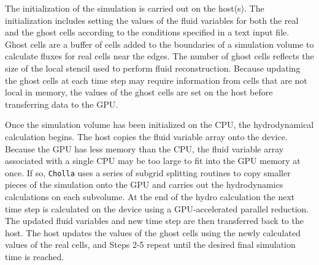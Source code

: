 \documentclass[11pt,letterpaper,english]{article}
\begin{document}
The initialization of the simulation is carried out on the host(s). The initialization includes setting the values of the fluid variables for both the real and the ghost cells according to the conditions specified in a text input file. Ghost cells are a buffer of cells added to the boundaries of a simulation volume to calculate fluxes for real cells near the edges. The number of ghost cells reflects the size of the local stencil used to perform fluid reconstruction. Because updating the ghost cells at each time step may require information from cells that are not local in memory, the values of the ghost cells are set on the host before transferring data to the GPU.

Once the simulation volume has been initialized on the CPU, the hydrodynamical calculation begins. The host copies the fluid variable array onto the device. Because the GPU has less memory than the CPU, the fluid variable array associated with a single CPU may be too large to fit into the GPU memory at once. If so, {\tt Cholla} uses a series of 
subgrid splitting routines to copy smaller pieces of the simulation onto the GPU and carries out the hydrodynamics calculations on each subvolume. At the end of the hydro calculation the next time step is calculated on the device using a GPU-accelerated parallel reduction. The updated fluid variables and new time step are then transferred back to the host. The host updates the values of the ghost cells using the newly calculated values of the real cells, and Steps 2-5 repeat until the desired final simulation time is reached.
\end{document}
